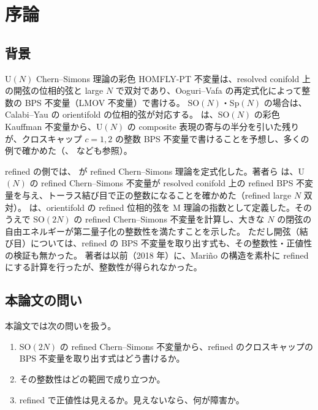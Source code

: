 \section{序論}\label{sec:intro}

\subsection{背景}
U$(N)$ Chern--Simons 理論の彩色 HOMFLY-PT 不変量は、resolved conifold 上の開弦の位相的弦と large $N$ で双対であり、Ooguri--Vafa の再定式化によって整数の BPS 不変量（LMOV 不変量）で書ける。
SO$(N)$・Sp$(N)$ の場合は、Calabi--Yau の orientifold の位相的弦が対応する。\cite{Marino09} は、SO$(N)$ の彩色 Kauffman 不変量から、U$(N)$ の composite 表現の寄与の半分を引いた残りが、クロスキャップ $c = 1, 2$ の整数 BPS 不変量で書けることを予想し、多くの例で確かめた（\cite{BFM04,BFM05}、\cite{NRZ13} なども参照）。

refined の側では、\cite{AgSh11} が refined Chern--Simons 理論を定式化した。著者ら \cite{KN17} は、U$(N)$ の refined Chern--Simons 不変量が resolved conifold 上の refined BPS 不変量を与え、トーラス結び目で正の整数になることを確かめた（refined large $N$ 双対）。
\cite{AgSc12} は、orientifold の refined 位相的弦を M 理論の指数として定義した。そのうえで SO$(2N)$ の refined Chern--Simons 不変量を計算し、大きな $N$ の閉弦の自由エネルギーが第二量子化の整数性を満たすことを示した。
ただし開弦（結び目）については、refined の BPS 不変量を取り出す式も、その整数性・正値性の検証も無かった。
著者は以前（2018 年）に、Mariño の構造を素朴に refined にする計算を行ったが、整数性が得られなかった。

\subsection{本論文の問い}
本論文では次の問いを扱う。
\begin{enumerate}
\item SO$(2N)$ の refined Chern--Simons 不変量から、refined のクロスキャップの BPS 不変量を取り出す式はどう書けるか。
\item その整数性はどの範囲で成り立つか。
\item refined で正値性は見えるか。見えないなら、何が障害か。
\end{enumerate}

